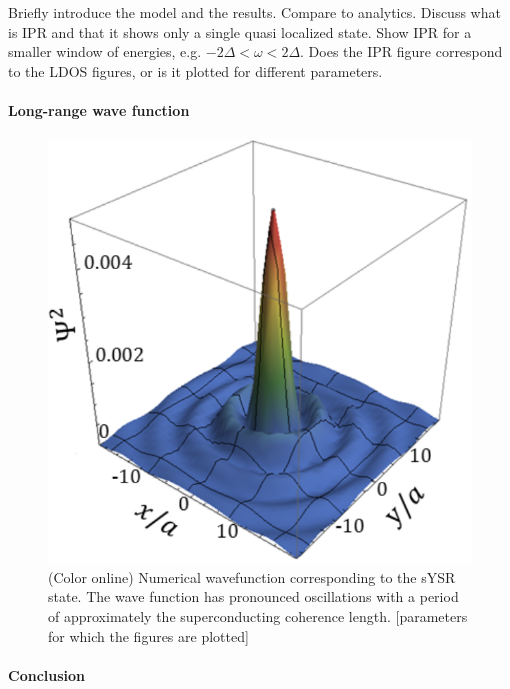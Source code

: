 \documentclass[twocolumn,showpacs,floatfix,nofootinbib,longbibliography]{revtex4-1}
\begin{document}
Briefly introduce the model and the results. Compare to analytics. Discuss what is IPR and that it shows only a single quasi localized state. Show IPR for a smaller window of energies, e.g. $-2\Delta<\omega<2\Delta$. Does the IPR figure correspond to the LDOS figures, or is it plotted for different parameters.  

\paragraph*{Long-range wave function} \label{sec:wavefuncion} 


\begin{figure} \centering
\includegraphics[width=0.7\linewidth]{WaveFunction}  
\caption{(Color online) Numerical wavefunction corresponding to the sYSR state. The wave function has pronounced oscillations with a period of approximately the superconducting coherence length. [parameters for which the figures are plotted]  } \label{fig:wavefunction}
\end{figure}




\paragraph*{Conclusion} \label{sec:conclusion}
\end{document}
